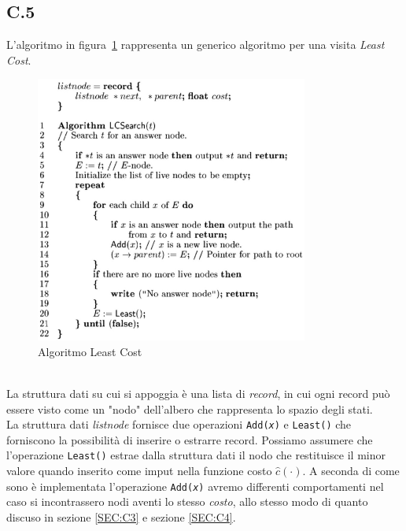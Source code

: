 \documentclass[a4paper]{article}
\begin{document}
\subsection{C.5}
L'algoritmo in figura~\ref{FIG:C5} rappresenta un generico algoritmo per una visita \textit{Least Cost}.\\
\begin{figure}[!ht]
\centering
\includegraphics[width=0.8\textwidth]{./img/C5.png}
\caption{Algoritmo Least Cost} \label{FIG:C5}
\end{figure}\\
La struttura dati su cui si appoggia è una lista di \textit{record}, in cui ogni record può essere visto come un "nodo" dell'albero che rappresenta lo spazio degli stati.\\
La struttura dati \textit{listnode} fornisce due operazioni \texttt{Add(\textit{x})} e \texttt{Least()} che forniscono la possibilità di inserire o estrarre record.
Possiamo assumere che l'operazione \texttt{Least()} estrae dalla struttura dati il nodo che restituisce il minor valore quando inserito come imput nella funzione costo $ \hat c(\cdot)$.
A seconda di come sono è implementata l'operazione \texttt{Add(\textit{x})} avremo differenti comportamenti nel caso si incontrassero nodi aventi lo stesso \textit{costo}, allo stesso modo di quanto discuso in sezione \ref{SEC:C3} e sezione \ref{SEC:C4}.
\end{document}
